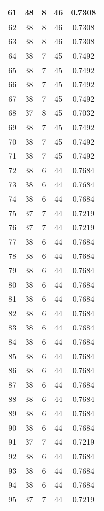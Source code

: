 \documentclass[letterpaper, 12pt]{article}
\begin{document}
\begin{longtable}{|c|c|c|c|c|}
\hline
61 & 38 & 8 & 46 & 0.7308 \\
\hline
62 & 38 & 8 & 46 & 0.7308 \\
\hline
63 & 38 & 8 & 46 & 0.7308 \\
\hline
64 & 38 & 7 & 45 & 0.7492 \\
\hline
65 & 38 & 7 & 45 & 0.7492 \\
\hline
66 & 38 & 7 & 45 & 0.7492 \\
\hline
67 & 38 & 7 & 45 & 0.7492 \\
\hline
68 & 37 & 8 & 45 & 0.7032 \\
\hline
69 & 38 & 7 & 45 & 0.7492 \\
\hline
70 & 38 & 7 & 45 & 0.7492 \\
\hline
71 & 38 & 7 & 45 & 0.7492 \\
\hline
72 & 38 & 6 & 44 & 0.7684 \\
\hline
73 & 38 & 6 & 44 & 0.7684 \\
\hline
74 & 38 & 6 & 44 & 0.7684 \\
\hline
75 & 37 & 7 & 44 & 0.7219 \\
\hline
76 & 37 & 7 & 44 & 0.7219 \\
\hline
77 & 38 & 6 & 44 & 0.7684 \\
\hline
78 & 38 & 6 & 44 & 0.7684 \\
\hline
79 & 38 & 6 & 44 & 0.7684 \\
\hline
80 & 38 & 6 & 44 & 0.7684 \\
\hline
81 & 38 & 6 & 44 & 0.7684 \\
\hline
82 & 38 & 6 & 44 & 0.7684 \\
\hline
83 & 38 & 6 & 44 & 0.7684 \\
\hline
84 & 38 & 6 & 44 & 0.7684 \\
\hline
85 & 38 & 6 & 44 & 0.7684 \\
\hline
86 & 38 & 6 & 44 & 0.7684 \\
\hline
87 & 38 & 6 & 44 & 0.7684 \\
\hline
88 & 38 & 6 & 44 & 0.7684 \\
\hline
89 & 38 & 6 & 44 & 0.7684 \\
\hline
90 & 38 & 6 & 44 & 0.7684 \\
\hline
91 & 37 & 7 & 44 & 0.7219 \\
\hline
92 & 38 & 6 & 44 & 0.7684 \\
\hline
93 & 38 & 6 & 44 & 0.7684 \\
\hline
94 & 38 & 6 & 44 & 0.7684 \\
\hline
95 & 37 & 7 & 44 & 0.7219 \\

\end{longtable}
\end{document}
